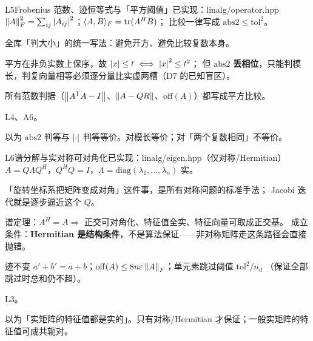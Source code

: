 \begin{know}{L5}{Frobenius 范数、迹恒等式与「平方阈值」}{已实现：linalg/operator.hpp}
 $\left\lVert A\right\rVert_{F}^{2}=\sum_{ij}\left\lvert A_{ij}\right\rvert^{2}$；$\langle A,B\rangle_{F}=\mathrm{tr}(A^{H}B)$；
比较一律写成 $\mathrm{abs2}\le \mathrm{tol}^{2}$。

 全库「判大小」的统一写法：避免开方、避免比较复数本身。

 平方在非负实数上保序，故 $\left\lvert x\right\rvert\le t\iff\left\lvert x\right\rvert^{2}\le t^{2}$；
但 $\mathrm{abs2}$ \textbf{丢相位}，只能判模长，判复向量相等必须逐分量比实虚两槽（D7 的已知盲区）。

 所有范数判据（$\left\lVert A^{\mathsf T}A-I\right\rVert$、$\left\lVert A-QR\right\rVert$、$\mathrm{off}(A)$）都写成平方比较。

 L4、A6。

 以为 $\mathrm{abs2}$ 判等与 $\left\lvert \cdot\right\rvert$ 判等等价。对模长等价；对「两个复数相同」不等价。
\end{know}

\begin{know}{L6}{谱分解与实对称可对角化}{已实现：linalg/eigen.hpp（仅对称/Hermitian）}
 $A=Q\Lambda Q^{H}$，$Q^{H}Q=I$，$\Lambda=\mathrm{diag}(\lambda_1,\dots,\lambda_n)$ 实。

 「旋转坐标系把矩阵变成对角」这件事，是所有对称问题的标准手法；
Jacobi 迭代就是逐步逼近这个 $Q$。

 谱定理：$A^{H}=A\Rightarrow$ 正交可对角化、特征值全实、特征向量可取成正交基。
成立条件：\textbf{Hermitian 是结构条件}，不是算法保证——非对称矩阵走这条路径会直接抛错。

 迹不变 $a'+b'=a+b$；$\mathrm{off}(A)\le 8n\varepsilon\left\lVert A\right\rVert_{F}$；单元素跳过阈值 $\mathrm{tol}^{2}/n_d$
（保证全部跳过时总和仍不超）。

 L3。

 以为「实矩阵的特征值都是实的」。只有对称/Hermitian 才保证；一般实矩阵的特征值可成共轭对。
\end{know}

